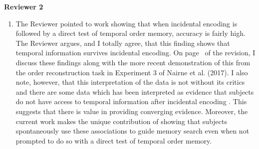 \documentclass[12pt]{article}
\begin{document}
\vspace{20pt}

\textbf{\large{Reviewer 2}}

\begin{enumerate}

	\item 
	The Reviewer pointed to work showing that when incidental encoding is followed by a direct test of temporal order memory, accuracy is fairly high. The Reviewer argues, and I totally agree, that this finding shows that temporal information survives incidental encoding. On page~\pageref{TODO-8} of the revision, I discuss these findings along with the more recent demonstration of this from the order reconstruction task in Experiment 3 of Nairne et al. (2017). I also note, however, that this interpretation of the data is not without its critics \cite{Hint16} and there are some data which has been interpreted as evidence that subjects do not have access to temporal information after incidental encoding \cite{BradGlen83,GlenBrad79}. This suggests that there is value in providing converging evidence. Moreover, the current work makes the unique contribution of showing that subjects spontaneously use these associations to guide memory search even when not prompted to do so with a direct test of temporal order memory.


\end{enumerate}
\end{document}
